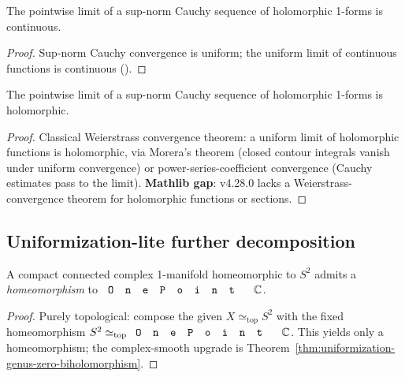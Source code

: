 \begin{lemma}
\label{lem:holomorphic-one-form-limit-continuous}
The pointwise limit of a sup-norm Cauchy sequence of holomorphic
1-forms is continuous.
\leanok
\end{lemma}
\begin{proof}\leanok
Sup-norm Cauchy convergence is uniform; the uniform limit of
continuous functions is continuous ().
\end{proof}

\begin{lemma}
\label{lem:holomorphic-one-form-limit-holomorphic}
The pointwise limit of a sup-norm Cauchy sequence of holomorphic
1-forms is holomorphic.
\leanok
\end{lemma}
\begin{proof}\leanok
Classical Weierstrass convergence theorem: a uniform limit of
holomorphic functions is holomorphic, via Morera's theorem (closed
contour integrals vanish under uniform convergence) or
power-series-coefficient convergence (Cauchy estimates pass to the
limit). \textbf{Mathlib gap}: v4.28.0 lacks a Weierstrass-convergence
theorem for holomorphic functions or sections.
\end{proof}

\subsection{Uniformization-lite further decomposition}
\label{sec:uniformization-lite-iter3}

\begin{lemma}
\label{lem:uniformization-genus-zero-homeomorphism}
A compact connected complex 1-manifold homeomorphic to \(S^2\) admits a
\emph{homeomorphism} to \(\code{OnePoint}\,\C\).
\leanok
\end{lemma}
\begin{proof}
\leanok
Purely topological: compose the given \(X\simeq_{\mathrm{top}}S^2\) with the
fixed homeomorphism \(S^2\simeq_{\mathrm{top}}\code{OnePoint}\,\C\). This yields
only a homeomorphism; the complex-smooth upgrade is
Theorem~\ref{thm:uniformization-genus-zero-biholomorphism}.
\end{proof}


